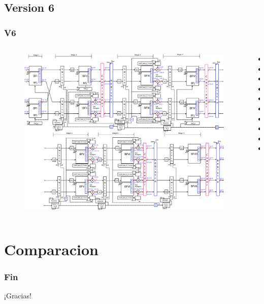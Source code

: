 \documentclass[t]{beamer}
\begin{document}
\subsection{Version 6}
\begin{frame}
\frametitle{V6}	
\begin{columns}[T] %
\begin{column}{.7\textwidth}
\vspace*{-0.8cm}
 \begin{figure}[ht]
    \centering
  \includegraphics[height=0.7\paperheight]{image/V5_esquema_p.eps} \\
    \end{figure}

\end{column}%

\begin{column}{.3\textwidth}


\begin{itemize}
\item
\item
\item
\item
\item
\item
\item
\item
\item
\item
\end{itemize}

\end{column}
\end{columns}

\end{frame}

\section{Comparacion}

\begin{frame}
 \frametitle{Fin}
\vspace*{2cm}
\centering
\begin{Huge}
    ¡Gracias!
\end{Huge}
\end{frame}
\end{document}
